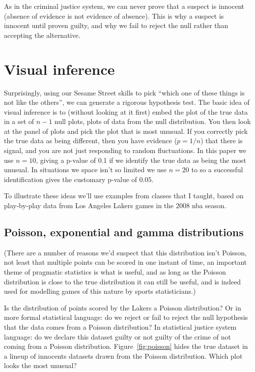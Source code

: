 \documentclass[oneside]{article}
\begin{document}
As in the criminal justice system, we can never prove that a suspect is innocent (absence of evidence is not evidence of absence). This is why a suspect is innocent until proven guilty, and why we fail to reject the null rather than accepting the alternative.

\section{Visual inference}
\label{sec:visual_inference}

Surprisingly, using our Sesame Street skills to pick ``which one of these things is not like the others'', we can generate a rigorous hypothesis test. The basic idea of visual inference is to (without looking at it first) embed the plot of the true data in a set of $n - 1$ null plots, plots of data from the null distribution. You then look at the panel of plots and pick the plot that is most unusual. If you correctly pick the true data as being different, then you have evidence ($p = 1/n$) that there is signal, and you are not just responding to random fluctuations. In this paper we use $n = 10$, giving a p-value of 0.1 if we identify the true data as being the most unusual. In situations we space isn't so limited we use $n = 20$ to so a successful identification gives the customary p-value of $0.05$.

To illustrate these ideas we'll use examples from classes that I taught, based on play-by-play data from Los Angeles Lakers games in the 2008 {\sc nba} season. 

\subsection{Poisson, exponential and gamma distributions}
\label{sub:univariate}

(There are a number of reasons we'd suspect that this distribution isn't Poisson, not least that multiple points can be scored in one instant of time, an important theme of pragmatic statistics is what is useful, and as long as the Poisson distribution is close to the true distribution it can still be useful, and is indeed used for modelling games of this nature by sports statisticians.)

Is the distribution of points scored by the Lakers a Poisson distribution? Or in more formal statistical language: do we reject or fail to reject the null hypothesis that the data comes from a Poisson distribution? In statistical justice system language: do we declare this dataset guilty or not guilty of the crime of not coming from a Poisson distribution. Figure~\ref{fig:poisson} hides the true dataset in a lineup of innocents datasets drawn from the Poisson distribution. Which plot looks the most unusual?
\end{document}
